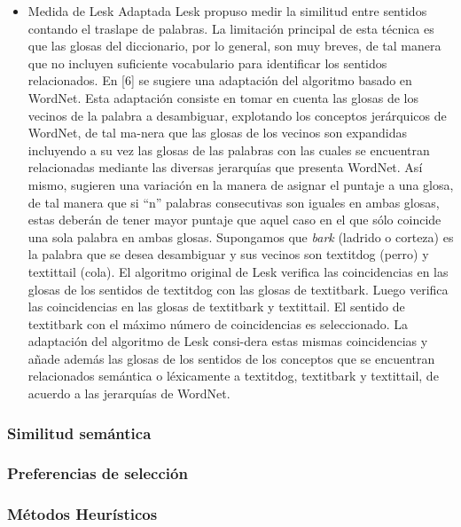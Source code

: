 \begin{itemize}
  \item Medida de Lesk Adaptada
    Lesk propuso medir la similitud entre sentidos contando el traslape de palabras. La limitación principal de esta técnica es que las glosas del diccionario, por lo general, son muy breves, de tal manera que no incluyen suficiente vocabulario para identificar los sentidos relacionados. En [6] se sugiere una adaptación del algoritmo basado en WordNet. Esta adaptación consiste en tomar en cuenta las glosas de los vecinos de la palabra a desambiguar, explotando los conceptos jerárquicos de WordNet, de tal ma-nera que las glosas de los vecinos son expandidas incluyendo a su vez las glosas de las palabras con las cuales se encuentran relacionadas mediante las diversas jerarquías que presenta WordNet. Así mismo, sugieren una variación en la manera de asignar el puntaje a una glosa, de tal manera que si “n” palabras consecutivas son iguales en ambas glosas, estas deberán de tener mayor puntaje que aquel caso en el que sólo coincide una sola palabra en ambas glosas. 
    Supongamos que \textit{bark} (ladrido o corteza) es la palabra que se desea desambiguar y sus vecinos son textit{dog} (perro) y textit{tail} (cola). El algoritmo original de Lesk verifica las coincidencias en las glosas de los sentidos de textit{dog} con las glosas de textit{bark}. Luego verifica las coincidencias en las glosas de textit{bark} y textit{tail}. El sentido de textit{bark} con el máximo número de coincidencias es seleccionado. La adaptación del algoritmo de Lesk consi-dera estas mismas coincidencias y añade además las glosas de los sentidos de los conceptos que se encuentran relacionados semántica o léxicamente a textit{dog}, textit{bark} y textit{tail}, de acuerdo a las jerarquías de WordNet.
\end{itemize}

\subsubsection{Similitud semántica}
\subsubsection{Preferencias de selección}
\subsubsection{Métodos Heurísticos}

